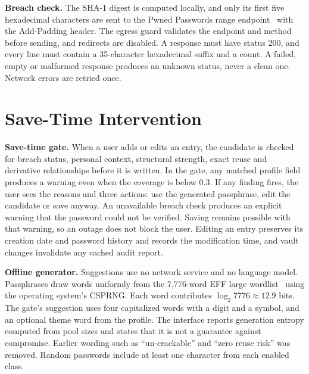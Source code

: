 \documentclass[preprint,12pt]{elsarticle}
\begin{document}
\textbf{Breach check.} The SHA-1 digest is computed locally, and only its first five hexadecimal characters are sent to the Pwned Passwords range endpoint~\cite{hibp} with the Add-Padding header. The egress guard validates the endpoint and method before sending, and redirects are disabled. A response must have status 200, and every line must contain a 35-character hexadecimal suffix and a count. A failed, empty or malformed response produces an unknown status, never a clean one. Network errors are retried once.

\section{Save-Time Intervention}
\textbf{Save-time gate.} When a user adds or edits an entry, the candidate is checked for breach status, personal context, structural strength, exact reuse and derivative relationships before it is written. In the gate, any matched profile field produces a warning even when the coverage is below 0.3. If any finding fires, the user sees the reasons and three actions: use the generated passphrase, edit the candidate or save anyway. An unavailable breach check produces an explicit warning that the password could not be verified. Saving remains possible with that warning, so an outage does not block the user. Editing an entry preserves its creation date and password history and records the modification time, and vault changes invalidate any cached audit report.

\textbf{Offline generator.} Suggestions use no network service and no language model. Passphrases draw words uniformly from the 7,776-word EFF large wordlist~\cite{eff} using the operating system's CSPRNG. Each word contributes $\log_2 7776\approx 12.9$ bits. The gate's suggestion uses four capitalized words with a digit and a symbol, and an optional theme word from the profile. The interface reports generation entropy computed from pool sizes and states that it is not a guarantee against compromise. Earlier wording such as ``un-crackable'' and ``zero reuse risk'' was removed. Random passwords include at least one character from each enabled class.
\end{document}
